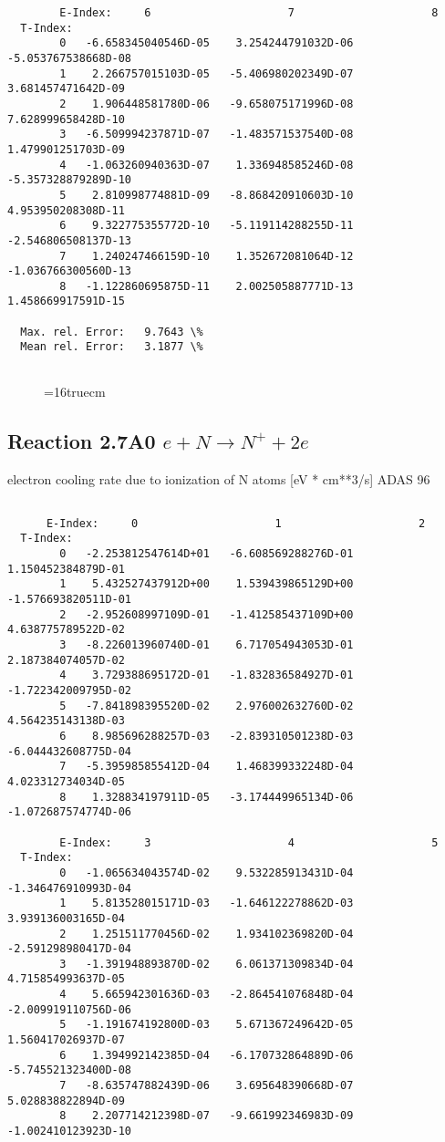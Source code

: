 \documentclass[12pt,dvipdfmx]{article}
\begin{document}
{\begin{small}
\begin{verbatim}
        E-Index:     6                     7                     8
  T-Index:
        0   -6.658345040546D-05    3.254244791032D-06   -5.053767538668D-08
        1    2.266757015103D-05   -5.406980202349D-07    3.681457471642D-09
        2    1.906448581780D-06   -9.658075171996D-08    7.628999658428D-10
        3   -6.509994237871D-07   -1.483571537540D-08    1.479901251703D-09
        4   -1.063260940363D-07    1.336948585246D-08   -5.357328879289D-10
        5    2.810998774881D-09   -8.868420910603D-10    4.953950208308D-11
        6    9.322775355772D-10   -5.119114288255D-11   -2.546806508137D-13
        7    1.240247466159D-10    1.352672081064D-12   -1.036766300560D-13
        8   -1.122860695875D-11    2.002505887771D-13    1.458669917591D-15

  Max. rel. Error:   9.7643 \%
  Mean rel. Error:   3.1877 \%


\end{verbatim}\end{small}
\begin{figure} \label{2.6il}
\epsfxsize=16truecm
\end{figure}
\newpage

\subsection{
  Reaction 2.7A0  $e + N  \rightarrow N^+   + 2e $
}
electron cooling rate due to ionization of N atoms [eV * cm**3/s]
ADAS 96

\begin{small}\begin{verbatim}

      E-Index:     0                     1                     2
  T-Index:
        0   -2.253812547614D+01   -6.608569288276D-01    1.150452384879D-01
        1    5.432527437912D+00    1.539439865129D+00   -1.576693820511D-01
        2   -2.952608997109D-01   -1.412585437109D+00    4.638775789522D-02
        3   -8.226013960740D-01    6.717054943053D-01    2.187384074057D-02
        4    3.729388695172D-01   -1.832836584927D-01   -1.722342009795D-02
        5   -7.841898395520D-02    2.976002632760D-02    4.564235143138D-03
        6    8.985696288257D-03   -2.839310501238D-03   -6.044432608775D-04
        7   -5.395985855412D-04    1.468399332248D-04    4.023312734034D-05
        8    1.328834197911D-05   -3.174449965134D-06   -1.072687574774D-06

        E-Index:     3                     4                     5
  T-Index:
        0   -1.065634043574D-02    9.532285913431D-04   -1.346476910993D-04
        1    5.813528015171D-03   -1.646122278862D-03    3.939136003165D-04
        2    1.251511770456D-02    1.934102369820D-04   -2.591298980417D-04
        3   -1.391948893870D-02    6.061371309834D-04    4.715854993637D-05
        4    5.665942301636D-03   -2.864541076848D-04   -2.009919110756D-06
        5   -1.191674192800D-03    5.671367249642D-05    1.560417026937D-07
        6    1.394992142385D-04   -6.170732864889D-06   -5.745521323400D-08
        7   -8.635747882439D-06    3.695648390668D-07    5.028838822894D-09
        8    2.207714212398D-07   -9.661992346983D-09   -1.002410123923D-10


\end{verbatim}
\end{small}}
\end{document}

